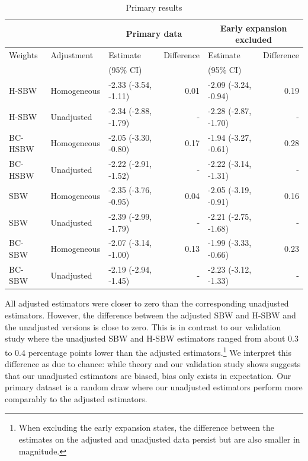 \documentclass[aoas]{imsart}
\theoremstyle{plain}
\theoremstyle{remark}
\begin{document}
\begin{table}[ht]
\begin{longtable}{lllrlr}\caption{Primary results}\label{tab:mainresults}
 \hline
 &  & \multicolumn{2}{c}{Primary data} & \multicolumn{2}{c}{Early expansion 
 excluded} \\
  \hline
Weights & Adjustment & Estimate  & Difference & Estimate & Difference\\ 
 &  & (95\% CI) &  & (95\% CI) & \\
  \hline
H-SBW & Homogeneous & -2.33 (-3.54, -1.11) & 0.01 & -2.09 (-3.24, -0.94) & 0.19 \\ 
  H-SBW & Unadjusted & -2.34 (-2.88, -1.79) & - & -2.28 (-2.87, -1.70) & - \\ 
  BC-HSBW & Homogeneous & -2.05 (-3.30, -0.80) & 0.17 & -1.94 (-3.27, -0.61) & 0.28 \\ 
  BC-HSBW & Unadjusted & -2.22 (-2.91, -1.52) & - & -2.22 (-3.14, -1.31) & - \\ 
  SBW & Homogeneous & -2.35 (-3.76, -0.95) & 0.04 & -2.05 (-3.19, -0.91) & 0.16 \\ 
  SBW & Unadjusted & -2.39 (-2.99, -1.79) & - & -2.21 (-2.75, -1.68) & - \\ 
  BC-SBW & Homogeneous & -2.07 (-3.14, -1.00) & 0.13 & -1.99 (-3.33, -0.66) & 0.23 \\ 
  BC-SBW & Unadjusted & -2.19 (-2.94, -1.45) & - & -2.23 (-3.12, -1.33) & - \\    
  \hline
\end{longtable}
\end{table}

All adjusted estimators were closer to zero than the corresponding unadjusted estimators. However, the difference between the adjusted SBW and H-SBW and the unadjusted versions is close to zero. This is in contrast to our validation study where the unadjusted SBW and H-SBW estimators ranged from about 0.3 to 0.4 percentage points lower than the adjusted estimators.\footnote{When excluding the early expansion states, the difference between the estimates on the adjusted and unadjusted data persist but are also smaller in magnitude.} We interpret this difference as due to chance: while theory and our validation study shows suggests that our unadjusted estimators are biased, bias only exists in expectation. Our primary dataset is a random draw where our unadjusted estimators perform more comparably to the adjusted estimators.
\end{document}
